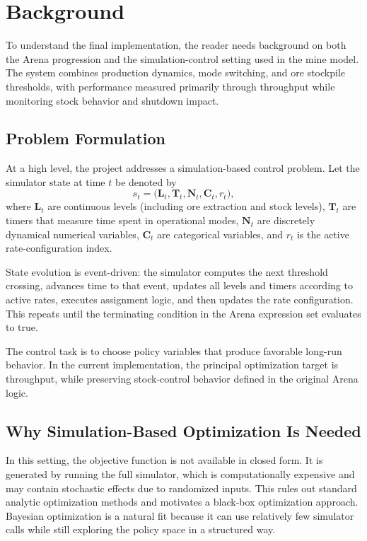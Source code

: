 \documentclass[11pt]{article}
\begin{document}
\section{Background}
To understand the final implementation, the reader needs background on both the Arena progression and the simulation-control setting used in the mine model. The system combines production dynamics, mode switching, and ore stockpile thresholds, with performance measured primarily through throughput while monitoring stock behavior and shutdown impact.

\subsection{Problem Formulation}
At a high level, the project addresses a simulation-based control problem. Let the simulator state at time $t$ be denoted by
\[
s_t = \big(\mathbf{L}_t, \mathbf{T}_t, \mathbf{N}_t, \mathbf{C}_t, r_t\big),
\]
where $\mathbf{L}_t$ are continuous levels (including ore extraction and stock levels), $\mathbf{T}_t$ are timers that measure time spent in operational modes, $\mathbf{N}_t$ are discretely dynamical numerical variables, $\mathbf{C}_t$ are categorical variables, and $r_t$ is the active rate-configuration index.

State evolution is event-driven: the simulator computes the next threshold crossing, advances time to that event, updates all levels and timers according to active rates, executes assignment logic, and then updates the rate configuration. This repeats until the terminating condition in the Arena expression set evaluates to true.

The control task is to choose policy variables that produce favorable long-run behavior. In the current implementation, the principal optimization target is throughput, while preserving stock-control behavior defined in the original Arena logic.

\subsection{Why Simulation-Based Optimization Is Needed}
In this setting, the objective function is not available in closed form. It is generated by running the full simulator, which is computationally expensive and may contain stochastic effects due to randomized inputs. This rules out standard analytic optimization methods and motivates a black-box optimization approach. Bayesian optimization is a natural fit because it can use relatively few simulator calls while still exploring the policy space in a structured way.
\end{document}

